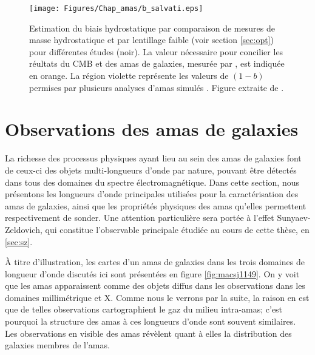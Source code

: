 \begin{figure}
    \centering
    \texttt{[image: Figures/Chap\_amas/b\_salvati.eps]}
    \hspace{15pt}
    \caption{
        Estimation du biais hydrostatique par comparaison de mesures de masse hydrostatique et par lentillage faible (voir section \ref{sec:opt}) pour différentes études (noir).
        La valeur nécessaire pour concilier les réultats du CMB et des amas de galaxies, mesurée par \cite{salvati_constraints_2018}, est indiquée en orange.
        La région violette représente les valeurs de $(1-b)$ permises par plusieurs analyses d'amas simulés \cite{planck_collaboration_planck_2013}.
        Figure extraite de \cite{salvati_constraints_2018}.
    }
    \label{fig:hse_bias}
\end{figure}

\section{Observations des amas de galaxies} \label{sec:cluster_obs}

La richesse des processus physiques ayant lieu au sein des amas de galaxies font de ceux-ci des objets multi-longueurs d'onde par nature, pouvant être détectés dans tous des domaines du spectre électromagnétique.
Dans cette section, nous présentons les longueurs d'onde principales utilisées pour la caractérisation des amas de galaxies, ainsi que les propriétés physiques des amas qu'elles permettent respectivement de sonder.
Une attention particulière sera portée à l'effet Sunyaev-Zeldovich, qui constitue l'observable principale étudiée au cours de cette thèse, en \ref{sec:sz}.

À titre d'illustration, les cartes d'un amas de galaxies dans les trois domaines de longueur d'onde discutés ici sont présentées en figure \ref{fig:macsj1149}.
On y voit que les amas apparaissent comme des objets diffus dans les observations dans les domaines millimétrique et X.
Comme nous le verrons par la suite, la raison en est que de telles observations cartographient le gaz du milieu intra-amas; c'est pourquoi la structure des amas à ces longueurs d'onde sont souvent similaires.
Les observations en visible des amas révèlent quant à elles la distribution des galaxies membres de l'amas.

